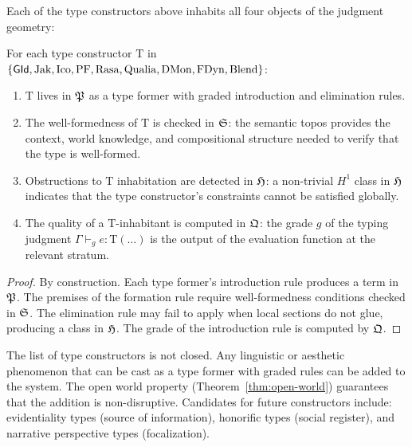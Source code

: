Each of the type constructors above inhabits all four objects of the
judgment geometry:

\begin{proposition}
\label{prop:four-object}
For each type constructor $\mathrm{T}$ in
$\{\mathsf{GId}, \mathrm{Jak}, \mathrm{Ico}, \mathrm{PF}, \mathrm{Rasa},
\mathrm{Qualia}, \mathrm{DMon}, \mathrm{FDyn}, \mathrm{Blend}\}$:
\begin{enumerate}[label=(\roman*)]
\item $\mathrm{T}$ lives in $\mathfrak{P}$ as a type former with graded
  introduction and elimination rules.
\item The well-formedness of $\mathrm{T}$ is checked in $\mathfrak{S}$:
  the semantic topos provides the context, world knowledge, and
  compositional structure needed to verify that the type is
  well-formed.
\item Obstructions to $\mathrm{T}$ inhabitation are detected in
  $\mathfrak{H}$: a non-trivial $H^1$ class in $\mathfrak{H}$ indicates that
  the type constructor's constraints cannot be satisfied globally.
\item The quality of a $\mathrm{T}$-inhabitant is computed in
  $\mathfrak{Q}$: the grade $g$ of the typing judgment
  $\Gamma \vdash_g e : \mathrm{T}(\ldots)$ is the output of the
  evaluation function at the relevant stratum.
\end{enumerate}
\end{proposition}

\begin{proof}
By construction.  Each type former's introduction rule produces a
term in $\mathfrak{P}$.  The premises of the formation rule require
well-formedness conditions checked in $\mathfrak{S}$.  The elimination
rule may fail to apply when local sections do not glue, producing
a class in $\mathfrak{H}$.  The grade of the introduction rule is computed
by $\mathfrak{Q}$.
\end{proof}

\begin{remark}[Extensibility]
The list of type constructors is not closed.  Any linguistic or
aesthetic phenomenon that can be cast as a type former with graded
rules can be added to the system.  The open world property
(Theorem~\ref{thm:open-world}) guarantees that the addition is
non-disruptive.  Candidates for future constructors include:
evidentiality types (source of information), honorific types
(social register), and narrative perspective types (focalization).
\end{remark}

